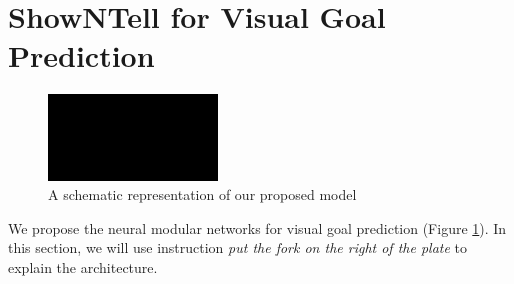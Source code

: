\documentclass[conference]{IEEEtran}
\begin{document}
\section{ShowNTell for Visual Goal Prediction}

\begin{figure}[h]
\begin{center}
\includegraphics[width=0.40\textwidth]{sample}
\end{center}
\caption{A schematic representation of our proposed model}
\label{architecture}
\end{figure}


We propose the neural modular networks for visual goal prediction (Figure \ref{architecture}). In this section, we will use instruction \textit{put the fork on the right of the plate} to explain the architecture.
\end{document}
